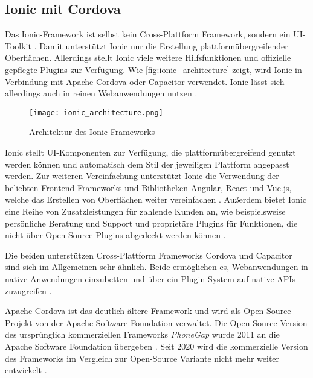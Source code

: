 \subsection{Ionic mit Cordova}
\label{sec:frameworks_ionic}

Das Ionic-Framework ist selbst kein Cross-Plattform Framework, sondern ein UI-Toolkit \cite{Ionic_Docs}.
Damit unterstützt Ionic nur die Erstellung plattformübergreifender Oberflächen.
Allerdings stellt Ionic viele weitere Hilfsfunktionen und offizielle gepflegte Plugins zur Verfügung.
Wie \autoref{fig:ionic_architecture} zeigt, wird Ionic in Verbindung mit Apache Cordova oder Capacitor verwendet.
Ionic lässt sich allerdings auch in reinen Webanwendungen nutzen \cite{Ionic_Docs}.
\begin{figure}[h]
    \centering
    \texttt{[image: ionic\_architecture.png]}
    \caption{Architektur des Ionic-Frameworks \cite{Ionic_Architektur}}
    \label{fig:ionic_architecture}
\end{figure}


Ionic stellt \ac{UI}-Komponenten zur Verfügung, die plattformübergreifend genutzt werden können und automatisch dem Stil der jeweiligen Plattform angepasst werden.
Zur weiteren Vereinfachung unterstützt Ionic die Verwendung der beliebten Frontend-Frameworks und Bibliotheken Angular, React und Vue.js, welche das Erstellen von Oberflächen weiter vereinfachen \cite{Ionic_Docs, Ionic_EvaluationGuide}.
Außerdem bietet Ionic eine Reihe von Zusatzleistungen für zahlende Kunden an, wie beispielsweise persönliche Beratung und Support und proprietäre Plugins für Funktionen, die nicht über Open-Source Plugins abgedeckt werden können \cite{Ionic_EvaluationGuide}.



Die beiden unterstützen Cross-Plattform Frameworks Cordova und Capacitor sind sich im Allgemeinen sehr ähnlich.
Beide ermöglichen es, Webanwendungen in native Anwendungen einzubetten und über ein Plugin-System auf native \acp{API} zuzugreifen \cite{Ionic_Cordova_vs_Capacitor}.


Apache Cordova ist das deutlich ältere Framework und wird als Open-Source-Projekt von der Apache Software Foundation verwaltet.
Die Open-Source Version des ursprünglich kommerziellen Frameworks \textit{PhoneGap} wurde 2011 an die Apache Software Foundation übergeben \cite{Steyer_Cordova}.
Seit 2020 wird die kommerzielle Version des Frameworks im Vergleich zur Open-Source Variante nicht mehr weiter entwickelt \cite{Adobe_PhoneGap_EOL}.


